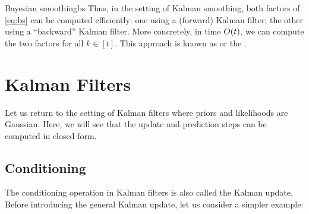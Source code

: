 \begin{rmk}{Bayesian smoothing}{bs}
  Thus, in the setting of Kalman smoothing, both factors of \cref{eq:bs} can be computed efficiently: one using a (forward) Kalman filter; the other using a ``backward'' Kalman filter.
  More concretely, in time $\BigO{t}$, we can compute the two factors for all $k \in [t]$.
  This approach is known as  or the .
\end{rmk}

\section{Kalman Filters}

Let us return to the setting of Kalman filters where priors and likelihoods are Gaussian.
Here, we will see that the update and prediction steps can be computed in closed form.

\subsection{Conditioning}

The conditioning operation in Kalman filters is also called the Kalman update.
Before introducing the general Kalman update, let us consider a simpler example:

